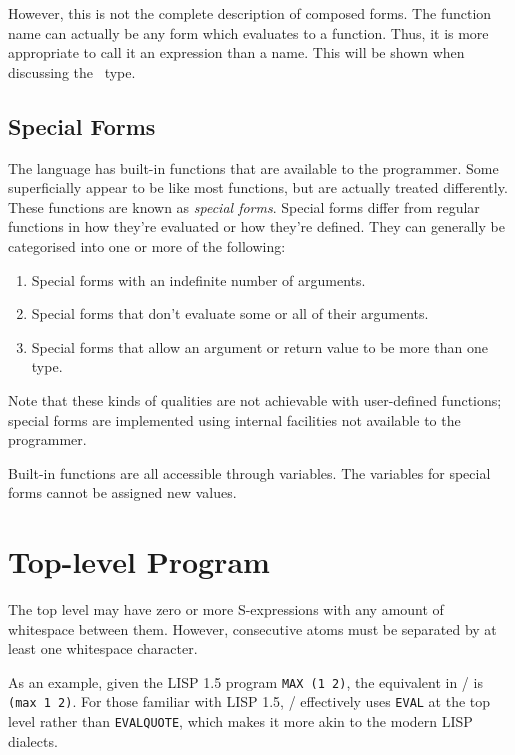 \documentclass[a4paper, 12pt]{article}
\begin{document}
However, this is not the complete description of composed forms. The function name can actually be any form which evaluates to a function. Thus, it is more appropriate to call it an expression than a name. This will be shown when discussing the~ type.

\subsection{Special Forms}
The language has built-in functions that are available to the programmer. Some superficially appear to be like most functions, but are actually treated differently. These functions are known as \textit{special forms}. Special forms differ from regular functions in how they're evaluated or how they're defined. They can generally be categorised into one or more of the following:

\begin{enumerate}
    \item Special forms with an indefinite number of arguments.
    \item Special forms that don't evaluate some or all of their arguments.
    \item Special forms that allow an argument or return value to be more than one type.
\end{enumerate}

Note that these kinds of qualities are not achievable with user-defined functions; special forms are implemented using internal facilities not available to the programmer.

Built-in functions are all accessible through variables. The variables for special forms cannot be assigned new values.

\section{Top-level Program}
The top level may have zero or more S-expressions with any amount of whitespace between them. However, consecutive atoms must be separated by at least one whitespace character.

As an example, given the LISP 1.5 program \texttt{MAX (1 2)}, the equivalent in \lispy/ is \texttt{(max 1 2)}. For those familiar with LISP 1.5, \lispy/ effectively uses \texttt{EVAL} at the top level rather than \texttt{EVALQUOTE}, which makes it more akin to the modern LISP dialects.
\end{document}
